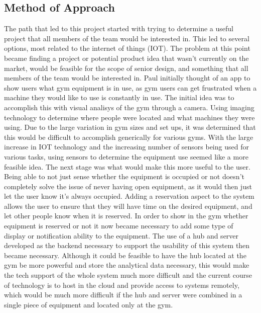 \documentclass[ppfs.tex]{template/subfiles}
\begin{document}
	\subsection{Method of Approach}
	The path that led to this project started with trying to determine a useful project that all members of the team would be interested in. This led to several options, most related to the internet of things (IOT). The problem at this point became finding a project or potential product idea that wasn't currently on the market, would be feasible for the scope of senior design, and something that all members of the team would be interested in. Paul initially thought of an app to show users what gym equipment is in use, as gym users can get frustrated when a machine they would like to use is constantly in use. The initial idea was to accomplish this with visual analisys of the gym through a camera. Using imaging technology to determine where people were located and what machines they were using. Due to the large variation in gym sizes and set ups, it was determined that this would be difficult to accomplish generically for various gyms. With the large increase in IOT technology and the increasing number of sensors being used for various tasks, using sensors to determine the equipment use seemed like a more feasible idea. The next stage was what would make this more useful to the user. Being able to not just sense whether the equipment is occupied or not doesn't completely solve the issue of never having open equipment, as it would then just let the user know it's always occupied. Adding a reservation aspect to the system allows the user to ensure that they will have time on the desired equipment, and let other people know when it is reserved. In order to show in the gym whether equipment is reserved or not it now became necessary to add some type of display or notification ability to the equipment. The use of a hub and server developed as the backend necessary to support the usability of this system then became necessary. Although it could be feasible to have the hub located at the gym be more powerful and store the analytical data necessary, this would make the tech support of the whole system much more difficult and the current course of technology is to host in the cloud and provide access to systems remotely, which would be much more difficult if the hub and server were combined in a single piece of equipment and located only at the gym. 
	
\end{document}
